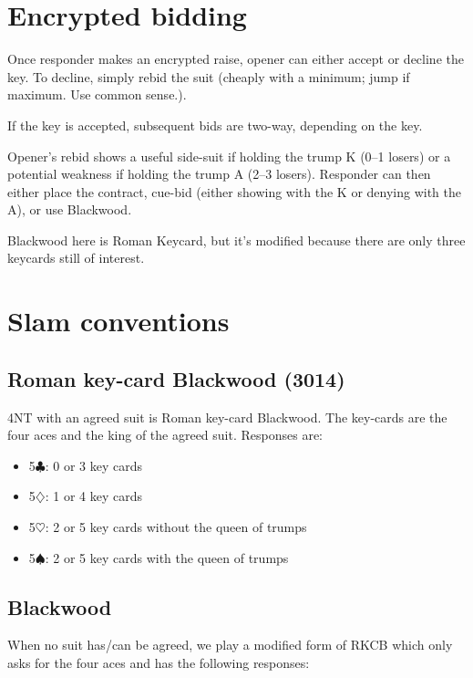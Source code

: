 \documentclass[a4paper,14pt]{extarticle}
\begin{document}
\newpage

\section{Encrypted bidding}
\label{sec:encryption}

Once responder makes an encrypted raise, opener can either accept or decline
the key.  To decline, simply rebid the suit (cheaply with a minimum; jump if
maximum.  Use common sense.).

If the key is accepted, subsequent bids are two-way, depending on the key.

Opener's rebid shows a useful side-suit if holding the trump
K (0--1 losers) or a potential weakness if holding the trump A (2--3 losers).
Responder can then either place the contract, cue-bid (either showing with the
K or denying with the A), or use Blackwood.

Blackwood here is Roman Keycard, but it's modified because there are only three keycards
still of interest.

\section{Slam conventions}
\label{sec:slam}

\subsection{Roman key-card Blackwood (3014)}
\label{sec:rkcb}

4NT with an agreed suit is Roman key-card Blackwood. The key-cards are the four aces
and the king of the agreed suit. Responses are:

\begin{itemize}
\item 5$\clubsuit$: 0 or 3 key cards
\item 5$\diamondsuit$: 1 or 4 key cards
\item 5$\heartsuit$: 2 or 5 key cards without the queen of trumps
\item 5$\spadesuit$: 2 or 5 key cards with the queen of trumps
\end{itemize}

\subsection{Blackwood}
\label{sec:blackwood}

When no suit has/can be agreed, we play a modified form of RKCB which only asks
for the four aces and has the following responses:
\end{document}
